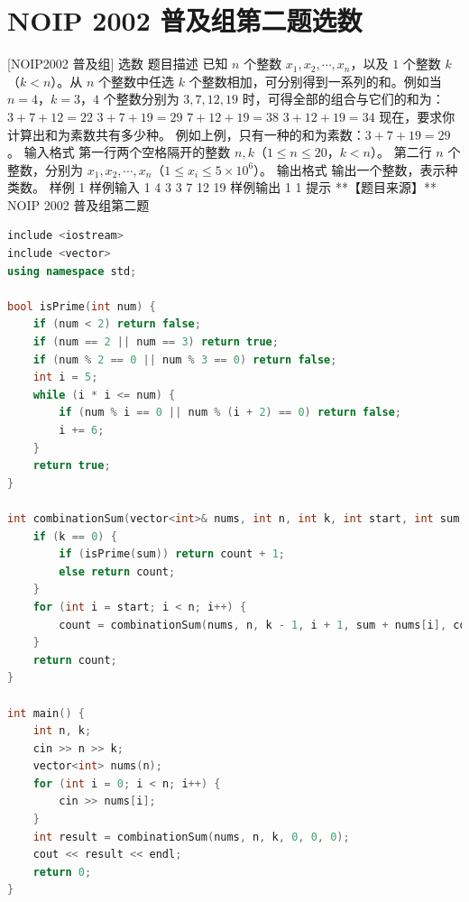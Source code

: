 \documentclass[12pt,twiside,a4paper]{ctexbook}
\numberwithin{chapter}{part}
\begin{document}
\section{NOIP 2002 普及组第二题选数}
 [NOIP2002 普及组] 选数
 题目描述
已知 $n$ 个整数 $x_1,x_2,\cdots,x_n$，以及 $1$ 个整数 $k$（$k<n$）。从 $n$ 个整数中任选 $k$ 个整数相加，可分别得到一系列的和。例如当 $n=4$，$k=3$，$4$ 个整数分别为 $3,7,12,19$ 时，可得全部的组合与它们的和为：
$3+7+12=22$
$3+7+19=29$
$7+12+19=38$
$3+12+19=34$
现在，要求你计算出和为素数共有多少种。
例如上例，只有一种的和为素数：$3+7+19=29$。
 输入格式
第一行两个空格隔开的整数 $n,k$（$1 \le n \le 20$，$k<n$）。
第二行 $n$ 个整数，分别为 $x_1,x_2,\cdots,x_n$（$1 \le x_i \le 5\times 10^6$）。
 输出格式
输出一个整数，表示种类数。
 样例 1
 样例输入 1
4 3
3 7 12 19
 样例输出 1
1
 提示
**【题目来源】**
NOIP 2002 普及组第二题
\begin{lstlisting}[language=c++,breaklines=true]
include <iostream>
include <vector>
using namespace std;

bool isPrime(int num) {
    if (num < 2) return false;
    if (num == 2 || num == 3) return true;
    if (num % 2 == 0 || num % 3 == 0) return false;
    int i = 5;
    while (i * i <= num) {
        if (num % i == 0 || num % (i + 2) == 0) return false;
        i += 6;
    }
    return true;
}

int combinationSum(vector<int>& nums, int n, int k, int start, int sum, int count) {
    if (k == 0) {
        if (isPrime(sum)) return count + 1;
        else return count;
    }
    for (int i = start; i < n; i++) {
        count = combinationSum(nums, n, k - 1, i + 1, sum + nums[i], count);
    }
    return count;
}

int main() {
    int n, k;
    cin >> n >> k;
    vector<int> nums(n);
    for (int i = 0; i < n; i++) {
        cin >> nums[i];
    }
    int result = combinationSum(nums, n, k, 0, 0, 0);
    cout << result << endl;
    return 0;
}
\end{lstlisting}
\end{document}

